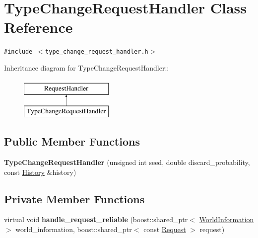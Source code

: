 \hypertarget{class_type_change_request_handler}{
\section{TypeChangeRequestHandler Class Reference}
\label{class_type_change_request_handler}
}
{\tt \#include $<$type\_\-change\_\-request\_\-handler.h$>$}

Inheritance diagram for TypeChangeRequestHandler::\begin{figure}[H]
\begin{center}
\leavevmode
\includegraphics[height=2cm]{class_type_change_request_handler}
\end{center}
\end{figure}
\subsection*{Public Member Functions}
\begin{CompactItemize}
\item 
\hypertarget{class_type_change_request_handler_c832f59730866b2a7dda685358743ac6}{
\textbf{TypeChangeRequestHandler} (unsigned int seed, double discard\_\-probability, const \hyperlink{class_history}{History} \&history)}
\label{class_type_change_request_handler_c832f59730866b2a7dda685358743ac6}

\end{CompactItemize}
\subsection*{Private Member Functions}
\begin{CompactItemize}
\item 
\hypertarget{class_type_change_request_handler_d6e47777fcdb40fe034b0e745364649c}{
virtual void \textbf{handle\_\-request\_\-reliable} (boost::shared\_\-ptr$<$ \hyperlink{class_world_information}{WorldInformation} $>$ world\_\-information, boost::shared\_\-ptr$<$ const \hyperlink{class_request}{Request} $>$ request)}
\label{class_type_change_request_handler_d6e47777fcdb40fe034b0e745364649c}

\end{CompactItemize}


